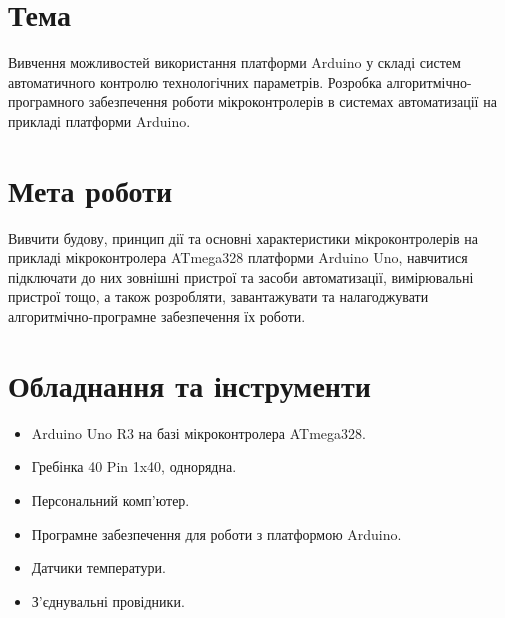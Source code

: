\documentclass[a4paper]{article}
\begin{document}
\section*{Тема}
Вивчення можливостей використання платформи Arduino у складі систем автоматичного контролю технологічних параметрів. Розробка алгоритмічно-програмного забезпечення роботи мікроконтролерів в системах автоматизації на прикладі платформи Arduino.

\section*{Мета роботи}
Вивчити будову, принцип дії та основні характеристики мікроконтролерів на прикладі мікроконтролера ATmega328 платформи Arduino Uno, навчитися підключати до них зовнішні пристрої та засоби автоматизації, вимірювальні пристрої тощо, а також розробляти, завантажувати та налагоджувати алгоритмічно-програмне забезпечення їх роботи.


\section*{Обладнання та інструменти}
\begin{itemize}
    \item Arduino Uno R3 на базі мікроконтролера ATmega328.
    \item Гребінка 40 Pin 1x40, однорядна.
    \item Персональний комп’ютер.
    \item Програмне забезпечення для роботи з платформою Arduino.
    \item Датчики температури.
    \item З’єднувальні провідники.
\end{itemize}

\newpage 
\end{document}
